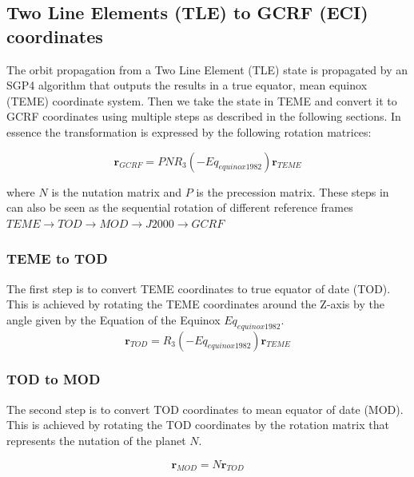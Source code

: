 \documentclass[12pt,letterpaper]{paper}
\begin{document}
\subsection{Two Line Elements (TLE) to GCRF (ECI) coordinates}

The orbit propagation from a Two Line Element (TLE) state is propagated by an SGP4 algorithm that outputs the results in a true equator, mean equinox (TEME) coordinate system. Then we take the state in TEME and convert it to GCRF coordinates using multiple steps as described in the following sections. In essence the transformation is expressed by the following rotation matrices:

\begin{equation}
\mathbf{r}_{GCRF} = P N R_3(-Eq_{equinox1982}) \mathbf{r}_{TEME}
\end{equation}

where $N$ is the nutation matrix and $P$ is the precession matrix. These steps in can also be seen as the sequential rotation of different reference frames $TEME \rightarrow TOD \rightarrow MOD \rightarrow J2000 \rightarrow GCRF $

\subsubsection{TEME to TOD}
The first step is to convert TEME coordinates to true equator of date (TOD). This is achieved by rotating the TEME coordinates around the Z-axis by the angle given by the Equation of the Equinox $Eq_{equinox1982}$.
\begin{equation}
\mathbf{r}_{TOD} = R_3(-Eq_{equinox1982}) \mathbf{r}_{TEME}
\end{equation}



\subsubsection{TOD to MOD}
The second step is to convert TOD coordinates to mean equator of date (MOD). This is achieved by rotating the TOD coordinates by the rotation matrix that represents the nutation of the planet $N$. 

\begin{equation}
\mathbf{r}_{MOD} = N \mathbf{r}_{TOD}
\end{equation}
\end{document}
